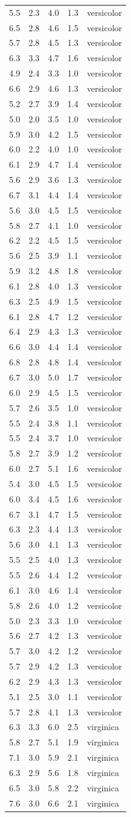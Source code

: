 \documentclass[
]{article}
\begin{document}
\begin{longtable}[]{@{}rrrrl@{}}
5.5 & 2.3 & 4.0 & 1.3 & versicolor\tabularnewline
6.5 & 2.8 & 4.6 & 1.5 & versicolor\tabularnewline
5.7 & 2.8 & 4.5 & 1.3 & versicolor\tabularnewline
6.3 & 3.3 & 4.7 & 1.6 & versicolor\tabularnewline
4.9 & 2.4 & 3.3 & 1.0 & versicolor\tabularnewline
6.6 & 2.9 & 4.6 & 1.3 & versicolor\tabularnewline
5.2 & 2.7 & 3.9 & 1.4 & versicolor\tabularnewline
5.0 & 2.0 & 3.5 & 1.0 & versicolor\tabularnewline
5.9 & 3.0 & 4.2 & 1.5 & versicolor\tabularnewline
6.0 & 2.2 & 4.0 & 1.0 & versicolor\tabularnewline
6.1 & 2.9 & 4.7 & 1.4 & versicolor\tabularnewline
5.6 & 2.9 & 3.6 & 1.3 & versicolor\tabularnewline
6.7 & 3.1 & 4.4 & 1.4 & versicolor\tabularnewline
5.6 & 3.0 & 4.5 & 1.5 & versicolor\tabularnewline
5.8 & 2.7 & 4.1 & 1.0 & versicolor\tabularnewline
6.2 & 2.2 & 4.5 & 1.5 & versicolor\tabularnewline
5.6 & 2.5 & 3.9 & 1.1 & versicolor\tabularnewline
5.9 & 3.2 & 4.8 & 1.8 & versicolor\tabularnewline
6.1 & 2.8 & 4.0 & 1.3 & versicolor\tabularnewline
6.3 & 2.5 & 4.9 & 1.5 & versicolor\tabularnewline
6.1 & 2.8 & 4.7 & 1.2 & versicolor\tabularnewline
6.4 & 2.9 & 4.3 & 1.3 & versicolor\tabularnewline
6.6 & 3.0 & 4.4 & 1.4 & versicolor\tabularnewline
6.8 & 2.8 & 4.8 & 1.4 & versicolor\tabularnewline
6.7 & 3.0 & 5.0 & 1.7 & versicolor\tabularnewline
6.0 & 2.9 & 4.5 & 1.5 & versicolor\tabularnewline
5.7 & 2.6 & 3.5 & 1.0 & versicolor\tabularnewline
5.5 & 2.4 & 3.8 & 1.1 & versicolor\tabularnewline
5.5 & 2.4 & 3.7 & 1.0 & versicolor\tabularnewline
5.8 & 2.7 & 3.9 & 1.2 & versicolor\tabularnewline
6.0 & 2.7 & 5.1 & 1.6 & versicolor\tabularnewline
5.4 & 3.0 & 4.5 & 1.5 & versicolor\tabularnewline
6.0 & 3.4 & 4.5 & 1.6 & versicolor\tabularnewline
6.7 & 3.1 & 4.7 & 1.5 & versicolor\tabularnewline
6.3 & 2.3 & 4.4 & 1.3 & versicolor\tabularnewline
5.6 & 3.0 & 4.1 & 1.3 & versicolor\tabularnewline
5.5 & 2.5 & 4.0 & 1.3 & versicolor\tabularnewline
5.5 & 2.6 & 4.4 & 1.2 & versicolor\tabularnewline
6.1 & 3.0 & 4.6 & 1.4 & versicolor\tabularnewline
5.8 & 2.6 & 4.0 & 1.2 & versicolor\tabularnewline
5.0 & 2.3 & 3.3 & 1.0 & versicolor\tabularnewline
5.6 & 2.7 & 4.2 & 1.3 & versicolor\tabularnewline
5.7 & 3.0 & 4.2 & 1.2 & versicolor\tabularnewline
5.7 & 2.9 & 4.2 & 1.3 & versicolor\tabularnewline
6.2 & 2.9 & 4.3 & 1.3 & versicolor\tabularnewline
5.1 & 2.5 & 3.0 & 1.1 & versicolor\tabularnewline
5.7 & 2.8 & 4.1 & 1.3 & versicolor\tabularnewline
6.3 & 3.3 & 6.0 & 2.5 & virginica\tabularnewline
5.8 & 2.7 & 5.1 & 1.9 & virginica\tabularnewline
7.1 & 3.0 & 5.9 & 2.1 & virginica\tabularnewline
6.3 & 2.9 & 5.6 & 1.8 & virginica\tabularnewline
6.5 & 3.0 & 5.8 & 2.2 & virginica\tabularnewline
7.6 & 3.0 & 6.6 & 2.1 & virginica\tabularnewline

\end{longtable}
\end{document}
